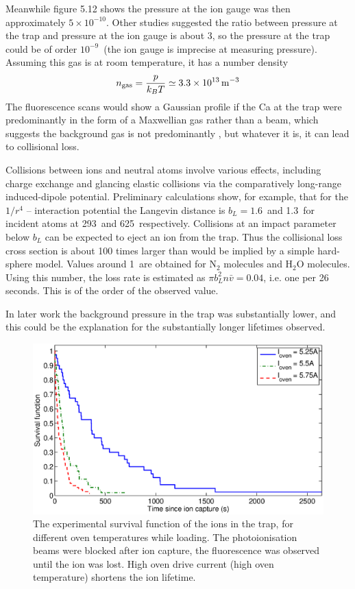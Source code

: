 Meanwhile figure 5.12 shows the pressure at the ion gauge was then approximately  $5 \times 10^{-10}$\torr. Other studies suggested the ratio between pressure at the trap and pressure at the ion gauge is about 3, so the pressure at the trap could be of order $10^{-9}$\torr\, (the ion gauge is imprecise at measuring \CaI{} pressure). Assuming this gas is at room temperature, it has a number density
\[ 
n_{\rm gas} = \frac{p}{k_B T} \simeq 3.3 \times 10^{13} \, {\rm m}^{-3}
\]
The fluorescence scans would show a Gaussian profile if the Ca at the trap were predominantly in the form of a Maxwellian gas rather than a beam, which suggests the background gas is not predominantly \CaI{}, but whatever it is, it can lead to collisional loss. 

Collisions between \Ca{} ions and neutral \CaI{} atoms involve various effects, including charge exchange and glancing elastic collisions via the comparatively long-range induced-dipole potential. Preliminary calculations \cite{Steane2008} show, for example, that for the $1/r^4$ \CaI{}--\Ca{} interaction potential the Langevin distance is $b_L = 1.6$\nm\, and 1.3\nm\, for incident atoms at 293\K\, and 625\K\, respectively. Collisions at an impact parameter below $b_L$ can be expected to eject an ion from the trap. Thus the collisional loss cross section is about 100 times larger than would be implied by a simple hard-sphere model. Values around 1\nm\, are obtained for N$_2$ molecules and H$_2$O molecules. Using this number, the loss rate is estimated as $\pi b_L^2 n \bar{v} = 0.04$, i.e. one per 26 seconds. This is of the order of the observed value.

In later work the background pressure in the trap was substantially lower, and this could be the explanation for the substantially longer lifetimes observed.



\begin{figure}[h!t]
\centering
\includegraphics[width=14.5cm]{chapter6/lifetime/lifetime_temps}
\caption[Effect of \CaI{} oven temperature on ion lifetime]{The experimental survival function of the ions in the trap, for different oven temperatures while loading. The photoionisation beams were blocked after ion capture, the fluorescence was observed until the ion was lost.  High oven drive current (high oven temperature) shortens the ion lifetime. \cversion}
\label{fig:lifetimeplot_temperature}
\end{figure} 

